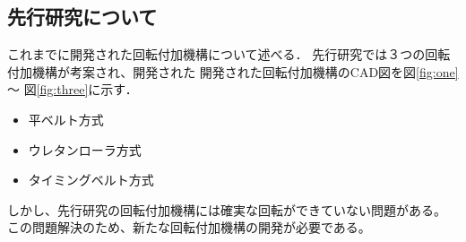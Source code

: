 \documentclass{classes/sice-si}
\begin{document}
\subsection{先行研究について}
これまでに開発された回転付加機構について述べる．
先行研究では３つの回転付加機構が考案され、開発された
開発された回転付加機構のCAD図を図\ref{fig:one} ～ 図\ref{fig:three}に示す．
\begin{itemize}
    \item 平ベルト方式  
    \item ウレタンローラ方式 
    \item タイミングベルト方式 
\end{itemize}
しかし、先行研究の回転付加機構には確実な回転ができていない問題がある。
この問題解決のため、新たな回転付加機構の開発が必要である。
\end{document}
